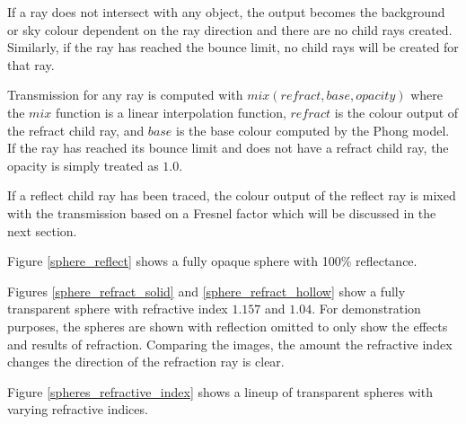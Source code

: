 \documentclass[final]{cmpreport}
\begin{document}
If a ray does not intersect with any object, the output becomes the background or sky colour dependent on the ray direction and there are no child rays created. Similarly, if the ray has reached the bounce limit, no child rays will be created for that ray. 

Transmission for any ray is computed with $mix(refract, base, opacity)$ where the $mix$ function is a linear interpolation function, $refract$ is the colour output of the refract child ray, and $base$ is the base colour computed by the Phong model. If the ray has reached its bounce limit and does not have a refract child ray, the opacity is simply treated as $1.0$.

If a reflect child ray has been traced, the colour output of the reflect ray is mixed with the transmission based on a Fresnel factor which will be discussed in the next section.

Figure \ref{sphere_reflect} shows a fully opaque sphere with 100\% reflectance.

Figures \ref{sphere_refract_solid} and \ref{sphere_refract_hollow} show a fully transparent sphere with refractive index $1.157$ and $1.04$. For demonstration purposes, the spheres are shown with reflection omitted to only show the effects and results of refraction. Comparing the images, the amount the refractive index changes the direction of the refraction ray is clear.

Figure \ref{spheres_refractive_index} shows a lineup of transparent spheres with varying refractive indices.
\end{document}
